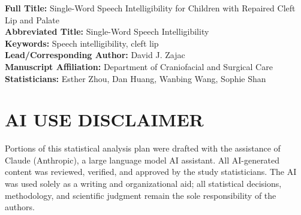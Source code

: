 \documentclass{article}
\begin{document}
\noindent\textbf{Full Title:} Single-Word Speech Intelligibility for Children with Repaired Cleft Lip and Palate\\
\textbf{Abbreviated Title:} Single-Word Speech Intelligibility  \\
\textbf{Keywords:} Speech intelligibility, cleft lip  \\
\textbf{Lead/Corresponding Author:} David J. Zajac \\
\textbf{Manuscript Affiliation:} Department of Craniofacial and Surgical Care \\
\textbf{Statisticians:} Esther Zhou, Dan Huang, Wanbing Wang, Sophie Shan \\

\vspace{1em}

\section*{AI USE DISCLAIMER}\label{sec:ai}
Portions of this statistical analysis plan were drafted with the assistance 
of Claude (Anthropic), a large language model AI assistant. All AI-generated 
content was reviewed, verified, and approved by the study statisticians. The 
AI was used solely as a writing and organizational aid; all statistical 
decisions, methodology, and scientific judgment remain the sole responsibility 
of the authors.

\end{document}
